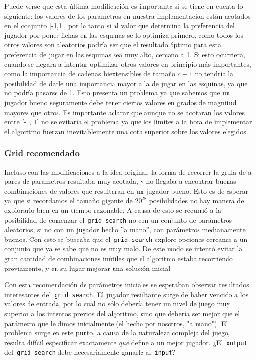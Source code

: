 \documentclass[A4paper,oneside,fleqn,11pt]{article}
\theoremstyle{definition}
\begin{document}
Puede verse que esta última modificación es importante si se tiene en cuenta lo siguiente: los valores de los parametros en nuestra implementación están acotados en el conjunto [-1,1], por lo tanto si al valor que determina la preferencia del jugador por poner fichas en las esquinas se lo optimiza primero, como todos los otros valores son aleatorios podría ser que el resultado óptimo para esta preferencia de jugar en las esquinas sea muy alto, cercano a 1. Si esto ocurriera, cuando se llegara a intentar optimizar otros valores en principio más importantes, como la importancia de cadenas biextensibles de tamaño $c-1$ no tendría la posibilidad de darle una importancia mayor a la de jugar en las esquinas, ya que no podría pasarse de 1. Esto presenta un problema ya que sabemos que un jugador bueno seguramente debe tener ciertos valores en grados de magnitud mayores que otros. Es importante aclarar que aunque no se acotaran los valores entre [-1, 1] no se evitaría el problema ya que los límites a la hora de implementar el algoritmo fuerzan inevitablemente una cota superior sobre los valores elegidos.



\subsubsection{Grid recomendado}

Incluso con las modificaciones a la idea original, la forma de recorrer la grilla de a pares de parametros resultaba muy acotada, y no llegaba a encontrar buenas combinaciones de valores que resultaran en un jugador bueno. Esto es de esperar ya que si recordamos el tamaño gigante de $ 20^{28}$ posibilidades no hay manera de explorarlo bien en un tiempo razonable. A causa de esto se recurrió a la posibilidad de comenzar el\texttt{ grid search} no con un conjunto de parámetros aleatorios, si no con un jugador hecho ''a mano'', con parámetros medianamente buenos. Con esto se buscaba que el\texttt{ grid search} explore opciones cercanas a un conjunto que ya se sabe que no es muy malo. De este modo se intentó evitar la gran cantidad de combinaciones inútiles que el algoritmo estaba recorriendo previamente, y en su lugar mejorar una solución inicial.

Con esta recomendación de parámetros iniciales se esperaban observar resultados interesantes del\texttt{ grid search}. El jugador resultante surge de haber vencido a los valores de entrada, por lo cual no sólo debería tener un nivel de juego muy superior a los intentos previos del algoritmo, sino que debería ser mejor que el parámetro que le dimos inicialmente (el hecho por nosotros, "a mano"). El problema surge en este punto, a causa de la naturaleza compleja del juego, resulta difícil especificar exactamente \textit{qué} define a un mejor jugador. ¿El\texttt{ output} del\texttt{ grid search} debe necesariamente ganarle al\texttt{ input}? 
\end{document}
